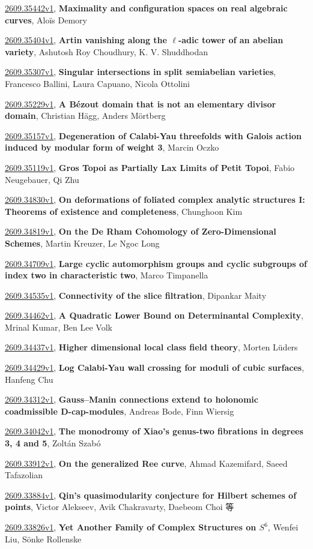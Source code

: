 \documentclass[9pt, a4paper]{article}
\theoremstyle{plain}
\theoremstyle{definition}
\theoremstyle{remark}
\newcommand{\arxiv}[3]{\href{https://arxiv.org/abs/#1}{#1}, \textbf{\textcolor{arxivblue}{#2}}, #3}
\begin{document}
\arxiv{2609.35442v1}{Maximality and configuration spaces on real algebraic curves}{Aloïs Demory}

\arxiv{2609.35404v1}{Artin vanishing along the $\ell$-adic tower of an abelian variety}{Ashutosh Roy Choudhury, K. V. Shuddhodan}

\arxiv{2609.35307v1}{Singular intersections in split semiabelian varieties}{Francesco Ballini, Laura Capuano, Nicola Ottolini}

\arxiv{2609.35229v1}{A Bézout domain that is not an elementary divisor domain}{Christian Hägg, Anders Mörtberg}

\arxiv{2609.35157v1}{Degeneration of Calabi-Yau threefolds with Galois action induced by modular form of weight 3}{Marcin Oczko}

\arxiv{2609.35119v1}{Gros Topoi as Partially Lax Limits of Petit Topoi}{Fabio Neugebauer, Qi Zhu}

\arxiv{2609.34830v1}{On deformations of foliated complex analytic structures I: Theorems of existence and completeness}{Chunghoon Kim}

\arxiv{2609.34819v1}{On the De Rham Cohomology of Zero-Dimensional Schemes}{Martin Kreuzer, Le Ngoc Long}

\arxiv{2609.34709v1}{Large cyclic automorphism groups and cyclic subgroups of index two in characteristic two}{Marco Timpanella}

\arxiv{2609.34535v1}{Connectivity of the slice filtration}{Dipankar Maity}

\arxiv{2609.34462v1}{A Quadratic Lower Bound on Determinantal Complexity}{Mrinal Kumar, Ben Lee Volk}

\arxiv{2609.34437v1}{Higher dimensional local class field theory}{Morten Lüders}

\arxiv{2609.34429v1}{Log Calabi-Yau wall crossing for moduli of cubic surfaces}{Hanfeng Chu}

\arxiv{2609.34312v1}{Gauss--Manin connections extend to holonomic coadmissible D-cap-modules}{Andreas Bode, Finn Wiersig}

\arxiv{2609.34042v1}{The monodromy of Xiao's genus-two fibrations in degrees 3, 4 and 5}{Zoltán Szabó}

\arxiv{2609.33912v1}{On the generalized Ree curve}{Ahmad Kazemifard, Saeed Tafazolian}

\arxiv{2609.33884v1}{Qin's quasimodularity conjecture for Hilbert schemes of points}{Victor Alekseev, Avik Chakravarty, Daebeom Choi 等}

\arxiv{2609.33826v1}{Yet Another Family of Complex Structures on $S^6$}{Wenfei Liu, Sönke Rollenske}
\end{document}
